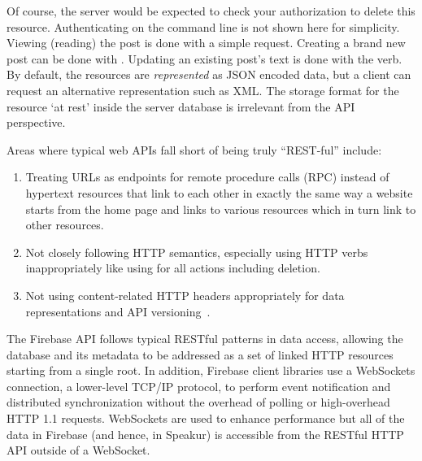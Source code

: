 Of course, the server would be expected to check your authorization to delete this resource.
Authenticating on the command line is not shown here for simplicity.
Viewing (reading) the post is done with a simple  request.
Creating a brand new post can be done with .
Updating an existing post's text is done with the  verb.
By default, the resources are \textit{represented} as JSON encoded data, 
but a client can request an alternative representation such as XML.
The storage format for the resource `at rest' inside the server database is irrelevant from the API perspective.

Areas where typical web APIs fall short of being truly ``REST-ful'' include:
\begin{enumerate}
\item Treating URLs as endpoints for remote procedure calls (RPC) instead of hypertext resources that link to each other in exactly the same way a website starts from the home page and links to various resources which in turn link to other resources.
\item Not closely following HTTP semantics, especially using HTTP verbs inappropriately like using  for all actions including deletion.
\item Not using content-related HTTP headers appropriately for data representations and API versioning~\cite{steveklabnik2011}.
\end{enumerate}

The Firebase API follows typical RESTful patterns in data access, allowing the database 
and its metadata to be addressed as a set of linked HTTP resources starting from a single root.
In addition, Firebase client libraries use a WebSockets connection, 
a lower-level TCP/IP protocol, 
to perform event notification and distributed synchronization without the overhead of polling or high-overhead HTTP 1.1 requests.
WebSockets are used to enhance performance but all of the data in Firebase 
(and hence, in Speakur) 
is accessible from the RESTful HTTP API outside of a WebSocket.

